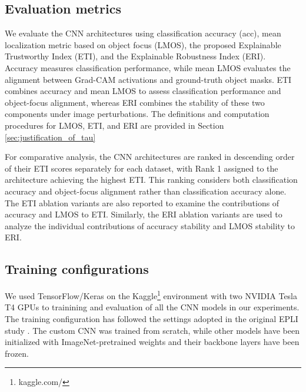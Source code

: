 \documentclass[a4paper,fleqn]{cas-dc}
\begin{document}
	
	\subsection{Evaluation metrics}

    We evaluate the CNN architectures using classification accuracy (acc), mean localization metric based on object focus (LMOS), the proposed Explainable Trustworthy Index (ETI), and the Explainable Robustness Index (ERI). Accuracy measures classification performance, while mean LMOS evaluates the alignment between Grad-CAM activations and ground-truth object masks. ETI combines accuracy and mean LMOS to assess classification performance and object-focus alignment, whereas ERI combines the stability of these two components under image perturbations. The definitions and computation procedures for LMOS, ETI, and ERI are provided in Section \ref{sec:justification_of_tau}

For comparative analysis, the CNN architectures are ranked in descending order of their ETI scores separately for each dataset, with Rank 1 assigned to the architecture achieving the highest ETI. This ranking considers both classification accuracy and object-focus alignment rather than classification accuracy alone. The ETI ablation variants are also reported to examine the contributions of accuracy and LMOS to ETI. Similarly, the ERI ablation variants are used to analyze the individual contributions of accuracy stability and LMOS stability to ERI.
	
	
	\subsection{Training configurations}
	We used TensorFlow/Keras on the Kaggle\footnote{kaggle.com/} environment with two NVIDIA Tesla T4 GPUs to trainining and evaluation of all the CNN models in our experiments. 
	The training configuration has followed the settings adopted in the original EPLI study \cite{r26}. 
	The custom CNN was trained from scratch, while other models have been initialized with ImageNet-pretrained weights \cite{r42} and their backbone layers have been frozen.
	
\end{document}
